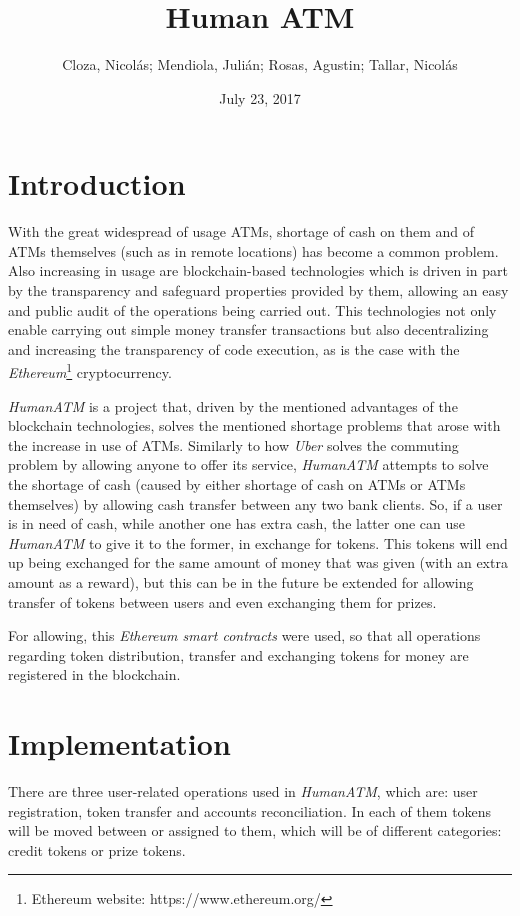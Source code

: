 \documentclass[a4paper]{article}
\title{Human ATM}
\author{Cloza, Nicolás; Mendiola, Julián; Rosas, Agustin; Tallar, Nicolás}
\date{July 23, 2017}
\begin{document}
\maketitle

\section{Introduction}

With the great widespread of usage ATMs, shortage of cash on them and of ATMs themselves (such as in remote locations) has become a common problem. Also increasing in usage are blockchain-based technologies which is driven in part by the transparency and safeguard properties provided by them, allowing an easy and public audit of the operations being carried out. This technologies not only enable carrying out simple money transfer transactions but also decentralizing and increasing the transparency of code execution, as is the case with the \textit{Ethereum}\footnote{Ethereum website: https://www.ethereum.org/} cryptocurrency.

\textit{HumanATM} is a project that, driven by the mentioned advantages of the blockchain technologies, solves the mentioned shortage problems that arose with the increase in use of ATMs. Similarly to how \textit{Uber} solves the commuting problem by allowing anyone to offer its service, \textit{HumanATM} attempts to solve the shortage of cash (caused by either shortage of cash on ATMs or ATMs themselves) by allowing cash transfer between any two bank clients. So, if a user is in need of cash, while another one has extra cash, the latter one can use \textit{HumanATM} to give it to the former, in exchange for tokens. This tokens will end up being exchanged for the same amount of money that was given (with an extra amount as a reward), but this can be in the future be extended for allowing transfer of tokens between users and even exchanging them for prizes.

For allowing, this \textit{Ethereum smart contracts} were used, so that all operations regarding token distribution, transfer and exchanging tokens for money are registered in the blockchain.

\section{Implementation}

There are three user-related operations used in \textit{HumanATM}, which are: user registration, token transfer and accounts reconciliation. In each of them tokens will be moved between or assigned to them, which will be of different categories: credit tokens or prize tokens.
\end{document}
